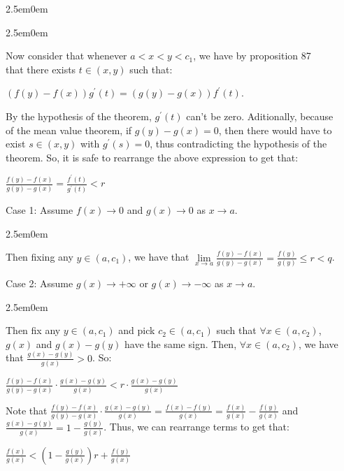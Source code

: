 \documentclass{book}
\newcommand{\hFour}{%
   \color{Cerulean}
   \fontsize{12}{14}\selectfont%
}
\newenvironment{myIndent}{%
   \begin{adjustwidth}{2.5em}{0em}%
}{%
   \end{adjustwidth}%
}
\newcommand{\retTwo}{\hfill\bigbreak}
\begin{document}
{\begin{myIndent}
{\begin{myIndent}
      Now consider that whenever $a < x < y < c_1$, we have by proposition 87\\ that there exists $t \in (x, y)$ such that:

      {\center $ (f(y) - f(x))g^\prime(t) = (g(y) - g(x))f^\prime(t)$.\retTwo\par}

      By the hypothesis of the theorem, $g^\prime(t)$ can't be zero. Aditionally, because\\ of the mean value theorem, if $g(y) - g(x) = 0$, then there would have to\\ exist $s \in (x, y)$ with $g^\prime(s) = 0$, thus contradicting the hypothesis of the\\ theorem. So, it is safe to rearrange the above expression to get that:

      {\center $\frac{f(y) - f(x)}{g(y) - g(x)} = \frac{f^\prime(t)}{g^\prime(t)} < r$ \retTwo\par}

      
      Case 1: Assume $f(x) \rightarrow 0$ and $g(x) \rightarrow 0$ as $x \rightarrow a$.
      {\begin{myIndent}\hFour
         Then fixing any $y \in (a, c_1)$, we have that $\lim\limits_{x\rightarrow a}\frac{f(y) - f(x)}{g(y) - g(x)} = \frac{f(y)}{g(y)} \leq r < q$.\retTwo
      \end{myIndent}}

      Case 2: Assume $g(x) \rightarrow +\infty$ or $g(x) \rightarrow -\infty$ as $x \rightarrow a$.
      {\begin{myIndent}\hFour
         Then fix any $y \in (a, c_1)$ and pick $c_2 \in (a, c_1)$ such that $\forall x \in (a, c_2)$,\\ $g(x)$ and $g(x) - g(y)$ have the same sign. Then, $\forall x \in (a, c_2)$, we have\\ that $\frac{g(x) - g(y)}{g(x)} > 0$. So:

         {\center $ \frac{f(y) - f(x)}{g(y) - g(x)}\cdot\frac{g(x) - g(y)}{g(x)} < r \cdot \frac{g(x) - g(y)}{g(x)} $ \retTwo\par}

        Note that $\frac{f(y) - f(x)}{g(y) - g(x)}\cdot\frac{g(x) - g(y)}{g(x)} = \frac{f(x) - f(y)}{g(x)} = \frac{f(x)}{g(x)} - \frac{f(y)}{g(x)}$ and\\ $\frac{g(x) - g(y)}{g(x)} = 1 - \frac{g(y)}{g(x)}$. Thus, we can rearrange terms to get that:\\ [-8pt]

         {\center $ \frac{f(x)}{g(x)} < \left(1 - \frac{g(y)}{g(x)}\right)r + \frac{f(y)}{g(x)}$ \retTwo\par}


\end{myIndent}}
\end{myIndent}}
\end{myIndent}}
\end{document}
